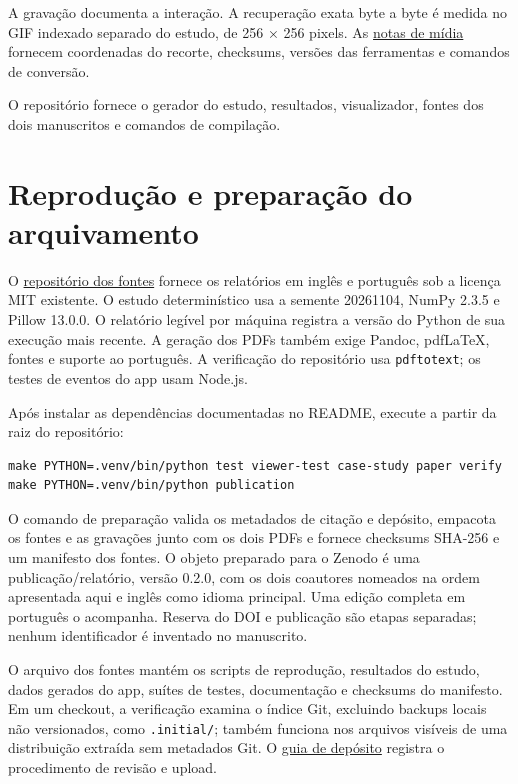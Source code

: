 \documentclass[
  11pt,
  a4paper,
]{article}
\begin{document}
A gravação documenta a interação. A recuperação exata byte a byte é
medida no GIF indexado separado do estudo, de 256 × 256 pixels. As
\href{https://github.com/cecil-ia-labs/datamatrix-payload/blob/main/docs/media/README.pt.md}{notas
de mídia} fornecem coordenadas do recorte, checksums, versões das
ferramentas e comandos de conversão.

O repositório fornece o gerador do estudo, resultados, visualizador,
fontes dos dois manuscritos e comandos de compilação.

\hypertarget{reproduuxe7uxe3o-e-preparauxe7uxe3o-do-arquivamento}{%
\section{Reprodução e preparação do
arquivamento}\label{reproduuxe7uxe3o-e-preparauxe7uxe3o-do-arquivamento}}

O \href{https://github.com/cecil-ia-labs/datamatrix-payload}{repositório
dos fontes} fornece os relatórios em inglês e português sob a licença
MIT existente. O estudo determinístico usa a semente 20261104, NumPy
2.3.5 e Pillow 13.0.0. O relatório legível por máquina registra a versão
do Python de sua execução mais recente. A geração dos PDFs também exige
Pandoc, pdfLaTeX, fontes e suporte ao português. A verificação do
repositório usa \texttt{pdftotext}; os testes de eventos do app usam
Node.js.

Após instalar as dependências documentadas no README, execute a partir
da raiz do repositório:

\begin{verbatim}
make PYTHON=.venv/bin/python test viewer-test case-study paper verify
make PYTHON=.venv/bin/python publication
\end{verbatim}

O comando de preparação valida os metadados de citação e depósito,
empacota os fontes e as gravações junto com os dois PDFs e fornece
checksums SHA-256 e um manifesto dos fontes. O objeto preparado para o
Zenodo é uma publicação/relatório, versão 0.2.0, com os dois coautores
nomeados na ordem apresentada aqui e inglês como idioma principal. Uma
edição completa em português o acompanha. Reserva do DOI e publicação
são etapas separadas; nenhum identificador é inventado no manuscrito.

O arquivo dos fontes mantém os scripts de reprodução, resultados do
estudo, dados gerados do app, suítes de testes, documentação e checksums
do manifesto. Em um checkout, a verificação examina o índice Git,
excluindo backups locais não versionados, como \texttt{.initial/};
também funciona nos arquivos visíveis de uma distribuição extraída sem
metadados Git. O
\href{https://github.com/cecil-ia-labs/datamatrix-payload/blob/main/docs/pt/publication.md}{guia
de depósito} registra o procedimento de revisão e upload.
\end{document}
